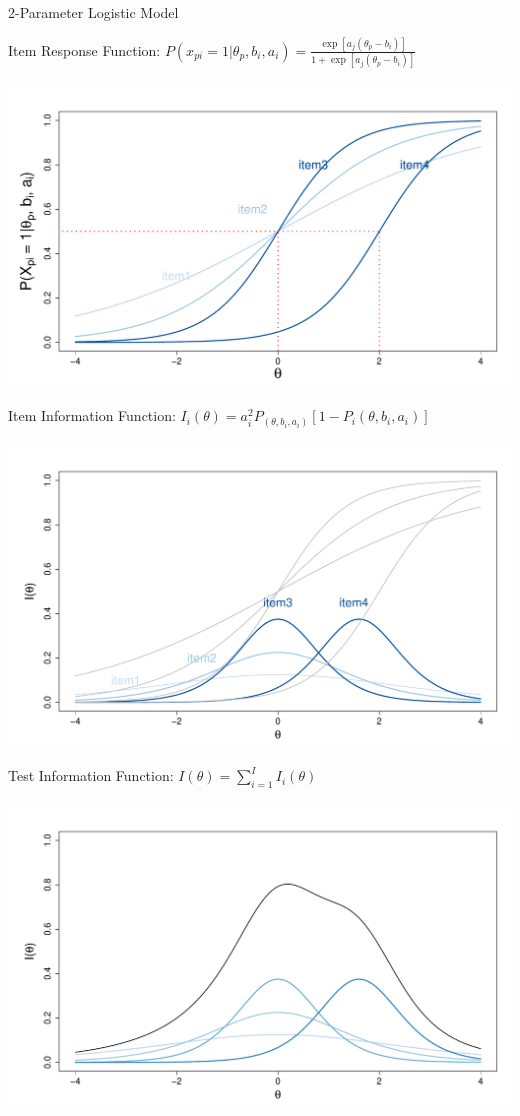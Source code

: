 \documentclass[aspectratio=149, xcolor=table]{beamer}
\begin{document}
\begin{frame}{2-Parameter Logistic Model}


\centering
\begin{overprint}

\centering
		\vspace*{1mm}
		
Item Response Function:	$P(x_{pi} = 1|\theta_p, b_i, a_i) = \frac{\exp[a_j(\theta_p - b_i)]}{1 + \exp[a_j(\theta_p - b_i)]}$
	
\vspace{1.5mm}
	\centering
	\includegraphics[width=.70\linewidth]{img/ICC-2pl.pdf}
	
		\vspace*{3mm}
		
Item Information Function:	$I_i(\theta) = a_i^2P_(\theta, b_i, a_i)[1-P_i(\theta, b_i, a_i)]$
	
	\centering
	\includegraphics[width=.70\linewidth]{img/IIF-2pl.pdf}
	
		\vspace*{3mm}
Test Information Function:		$I(\theta) =  \sum_{i = 1}^{I} I_i(\theta)$
	
	\centering
	\includegraphics[width=.70\linewidth]{img/TIF-2pl.pdf}
\end{overprint}
			
	
	
	
\end{frame}
\end{document}
